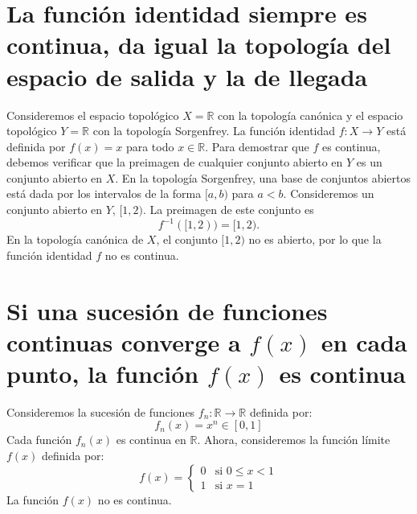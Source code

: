 \documentclass[12pt]{article}
\begin{document}
\section*{La función identidad siempre es continua, da igual la topología del espacio de
salida y la de llegada}
Consideremos el espacio topológico \( X = \mathbb{R} \) con la topología canónica y el espacio topológico \( Y = \mathbb{R} \) con la topología Sorgenfrey. La función identidad \( f: X \to Y \) está definida por \( f(x) = x \) para todo \( x \in \mathbb{R} \).
Para demostrar que \( f \) es continua, debemos verificar que la preimagen de cualquier conjunto abierto en \( Y \) es un conjunto abierto en \( X \). En la topología Sorgenfrey, una base de conjuntos abiertos está dada por los intervalos de la forma \([a, b)\) para \( a < b \).
Consideremos un conjunto abierto en \( Y \), \([1, 2)\). La preimagen de este conjunto es \[ f^{-1}([1, 2)) = [1, 2). \]
En la topología canónica de \( X \), el conjunto \([1, 2)\) no es abierto, por lo que la función identidad \( f \) no es continua.
\section*{Si una sucesión de funciones continuas converge a \(f(x)\) en cada punto, la función \(f(x)\) es continua}
Consideremos la sucesión de funciones \( f_n: \mathbb{R} \to \mathbb{R} \) definida por:
\[ f_n(x) = x^n \in [0,1]\]
Cada función \( f_n(x) \) es continua en \( \mathbb{R} \). Ahora, consideremos la función límite \( f(x) \) definida por:
\[ f(x) = \begin{cases} 
      0 & \text{si } 0 \leq x < 1 \\
      1 & \text{si } x = 1 
   \end{cases} \]
La función \( f(x) \) no es continua.
\end{document}
